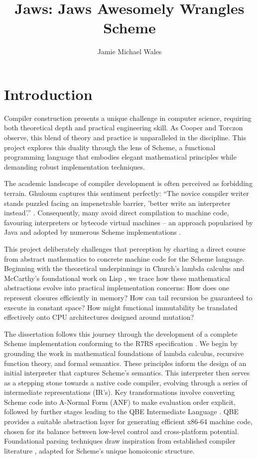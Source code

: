 \documentclass[final]{cmpreport_02}
\title{Jaws: Jaws Awesomely Wrangles Scheme}
\author{Jamie Michael Wales}
\begin{document}
\section{Introduction}

Compiler construction presents a unique challenge in computer science, requiring both theoretical depth and practical engineering skill. As Cooper and Torczon \cite{cooper2011engineering} observe, this blend of theory and practice is unparalleled in the discipline. This project explores this duality through the lens of Scheme, a functional programming language that embodies elegant mathematical principles while demanding robust implementation techniques.

The academic landscape of compiler development is often perceived as forbidding terrain. Ghuloum captures this sentiment perfectly: ``The novice compiler writer stands puzzled facing an impenetrable barrier, 'better write an interpreter instead'.'' \cite{ghuloum2006incremental}. Consequently, many avoid direct compilation to machine code, favouring interpreters or bytecode virtual machines – an approach popularised by Java \cite{oracle2024java} and adopted by numerous Scheme implementations \cite{SchemeImplementations}.

This project deliberately challenges that perception by charting a direct course from abstract mathematics to concrete machine code for the Scheme language. Beginning with the theoretical underpinnings in Church's lambda calculus \cite{church1936unsolvable} and McCarthy's foundational work on Lisp \cite{mccarthy1960recursive}, we trace how these mathematical abstractions evolve into practical implementation concerns: How does one represent closures efficiently in memory? How can tail recursion be guaranteed to execute in constant space? How might functional immutability be translated effectively onto CPU architectures designed around mutation?

The dissertation follows this journey through the development of a complete Scheme implementation conforming to the R7RS specification \cite{r7rs}. We begin by grounding the work in mathematical foundations of lambda calculus, recursive function theory, and formal semantics. These principles inform the design of an initial interpreter that captures Scheme's semantics. This interpreter then serves as a stepping stone towards a native code compiler, evolving through a series of intermediate representations (IR's). Key transformations involve converting Scheme code into A-Normal Form (ANF) \cite{flanagan1993essence} to make evaluation order explicit, followed by further stages leading to the QBE Intermediate Language \cite{qbe_il}. QBE provides a suitable abstraction layer for generating efficient x86-64 machine code, chosen for its balance between low-level control and cross-platform potential. Foundational parsing techniques draw inspiration from established compiler literature \cite{aho2006compilers}, adapted for Scheme's unique homoiconic structure.
\end{document}

